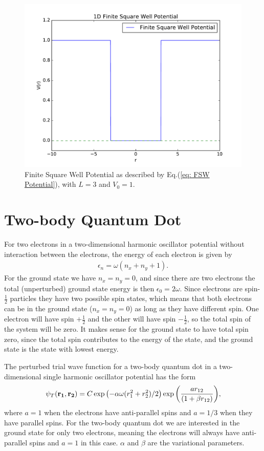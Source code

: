 \documentclass[../main.tex]{subfiles}
\begin{document}
\begin{figure}[!ht]
    \centering
    \includegraphics[scale=0.7]{figures/FSW_Potential}
    \caption{Finite Square Well Potential as described by Eq.(\ref{eq: FSW Potential}), with $L = 3$ and $V_0 = 1$.}
    \label{fig: FSW Potential}
\end{figure}


\section{Two-body Quantum Dot}
For two electrons in a two-dimensional harmonic oscillator potential without interaction between the electrons, the energy of each electron is given by
\begin{align}\label{eq: unperturbedEnergy}
    \epsilon_n = \omega(n_x + n_y + 1).
\end{align}
For the ground state we have $n_x=n_y=0$, and since there are two electrons the total (unperturbed) ground state energy is then $\epsilon_0 = 2\omega$. Since electrons are spin-$\frac{1}{2}$ particles they have two possible spin states, which means that both electrons can be in the ground state ($n_x=n_y=0$) as long as they have different spin. One electron will have spin $+\frac{1}{2}$ and the other will have spin $-\frac{1}{2}$, so the total spin of the system will be zero. It makes sense for the ground state to have total spin zero, since the total spin contributes to the energy of the state, and the ground state is the state with lowest energy.

The perturbed trial wave function for a two-body quantum dot in a two-dimensional single harmonic oscillator potential has the form \cite{FYS4411-LectureNotes}
\begin{align}
    \psi_{T}({\bf r_1},{\bf r_2}) = 
   C\exp{\left(-\alpha\omega(r_1^2+r_2^2)/2\right)}
   \exp{\left(\frac{ar_{12}}{(1+\beta r_{12})}\right)},
\end{align}
where $a=1$ when the electrons have anti-parallel spins and $a=1/3$ when they have parallel spins. For the two-body quantum dot we are interested in the ground state for only two electrons, meaning the electrons will always have anti-parallel spins and $a=1$ in this case. $\alpha$ and $\beta$ are the variational parameters.
\end{document}
